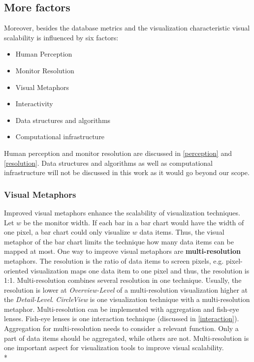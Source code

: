 


\subsection{More factors} \label{factors}
Moreover, besides the database metrics and the visualization characteristic visual scalability is influenced by six factors: 
\begin{itemize}
    \item Human Perception\cite{Keim2005,Deering1998}
    \item Monitor Resolution 
    \item Visual Metaphors
    \item Interactivity
    \item Data structures and algorithms
    \item Computational infrastructure
\end{itemize}
Human perception and monitor resolution are discussed in \ref{perception} and \ref{resolution}. Data structures and algorithms as well as computational infrastructure will not be discussed in this work as it would go beyond our scope. 

\subsubsection*{Visual Metaphors}
Improved visual metaphors enhance the scalability of visualization techniques\cite{Eick2002}. Let $w$ be the monitor width. If each bar in a bar chart would have the width of one pixel, a bar chart could only visualize  $w$ data items. Thus, the visual metaphor of the bar chart limits the technique how many data items can be mapped at most. One way to improve visual metaphors are \textbf{multi-resolution} metaphors\cite{Keim2005}. The resolution is the ratio of data items to screen pixels, e.g. pixel-oriented visualization maps one data item to one pixel and thus, the resolution is 1:1. Multi-resolution combines several resolution in one technique. Usually, the resolution is lower at \textit{Overview-Level} of a multi-resolution visualization higher at the \textit{Detail-Level}. \textit{CircleView} is one visualization technique with a multi-resolution metaphor.
Multi-resolution can be implemented with aggregation and fish-eye lenses. Fish-eye lenses is one interaction technique (discussed in \ref{interaction}). Aggregation for multi-resolution needs to consider a relevant function. Only a part of data items should be aggregated, while others are not.
Multi-resolution is one important aspect for visualization tools to improve visual scalability.
\\*


